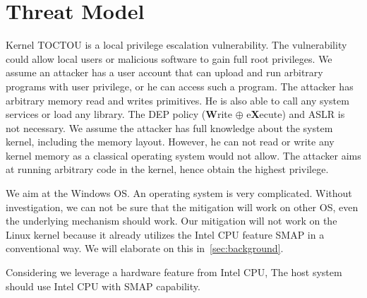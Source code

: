 \section{Threat Model}
\label{sec:threatmodel}

Kernel TOCTOU is a local privilege escalation vulnerability. The vulnerability could allow local users or malicious software to gain full root privileges. We assume an attacker has a user account that can upload and run arbitrary programs with user privilege, or he can access such a program. The attacker has arbitrary memory read and writes primitives. He is also able to call any system services or load any library. The DEP policy (\textbf{W}rite $\oplus$ e\textbf{X}ecute) and ASLR is not necessary. We assume the attacker has full knowledge about the system kernel, including the memory layout. However, he can not read or write any kernel memory as a classical operating system would not allow. The attacker aims at running arbitrary code in the kernel, hence obtain the highest privilege. 

We aim at the Windows OS. An operating system is very complicated. Without investigation,  we can not be sure that the mitigation will work on other OS, even the underlying mechanism should work. Our mitigation will not work on the Linux kernel because it already utilizes the Intel CPU feature SMAP in a conventional way. We will elaborate on this in~\autoref{sec:background}.

Considering we leverage a hardware feature from Intel CPU, The host system should use Intel CPU with SMAP capability.
